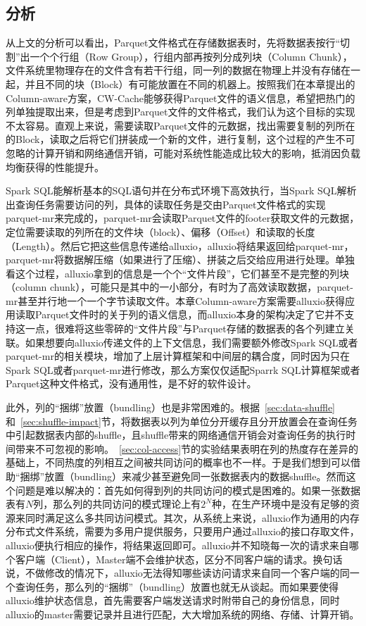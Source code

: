 \subsection{分析}
\label{subsec:simp-analysis}

\par 从上文的分析可以看出，Parquet文件格式在存储数据表时，先将数据表按行“切割”出一个个行组（Row Group），行组内部再按列分成列块（Column Chunk），文件系统里物理存在的文件含有若干行组，同一列的数据在物理上并没有存储在一起，并且不同的块（Block）有可能放置在不同的机器上。按照我们在本章提出的Column-aware方案，CW-Cache能够获得Parquet文件的语义信息，希望把热门的列单独提取出来，但是考虑到Parquet文件的文件格式，我们认为这个目标的实现不太容易。直观上来说，需要读取Parquet文件的元数据，找出需要复制的列所在的Block，读取之后将它们拼装成一个新的文件，进行复制，这个过程的产生不可忽略的计算开销和网络通信开销，可能对系统性能造成比较大的影响，抵消因负载均衡获得的性能提升。

\par Spark SQL能解析基本的SQL语句并在分布式环境下高效执行，当Spark SQL解析出查询任务需要访问的列，具体的读取任务是交由Parquet文件格式的实现parquet-mr\cite{parquet-mr}来完成的，parquet-mr会读取Parquet文件的footer获取文件的元数据，定位需要读取的列所在的文件块（block）、偏移（Offset）和读取的长度（Length）。然后它把这些信息传递给alluxio，alluxio将结果返回给parquet-mr，parquet-mr将数据解压缩（如果进行了压缩）、拼装之后交给应用进行处理。单独看这个过程，alluxio拿到的信息是一个个“文件片段”，它们甚至不是完整的列块（column chunk），可能只是其中的一小部分，有时为了高效读取数据，parquet-mr甚至并行地一个一个字节读取文件。本章Column-aware方案需要alluxio获得应用读取Parquet文件时的关于列的语义信息，而alluxio本身的架构决定了它并不支持这一点，很难将这些零碎的“文件片段”与Parquet存储的数据表的各个列建立关联。如果想要向alluxio传递文件的上下文信息，我们需要额外修改Spark SQL或者parquet-mr的相关模块，增加了上层计算框架和中间层的耦合度，同时因为只在Spark SQL或者parquet-mr进行修改，那么方案仅仅适配Sparrk SQL计算框架或者Parquet这种文件格式，没有通用性，是不好的软件设计。

\par 此外，列的“捆绑”放置（bundling）也是非常困难的。根据~\ref{sec:data-shuffle}和~\ref{sec:shuffle-impact}节，将数据表以列为单位分开缓存且分开放置会在查询任务中引起数据表内部的shuffle，且shuffle带来的网络通信开销会对查询任务的执行时间带来不可忽视的影响。~\ref{sec:col-access}节的实验结果表明在列的热度存在差异的基础上，不同热度的列相互之间被共同访问的概率也不一样。于是我们想到可以借助“捆绑”放置（bundling）来减少甚至避免同一张数据表内的数据shuffle。然而这个问题是难以解决的：首先如何得到列的共同访问的模式是困难的。如果一张数据表有$N$列，那么列的共同访问的模式理论上有$2^N$种，在生产环境中是没有足够的资源来同时满足这么多共同访问模式。其次，从系统上来说，alluxio作为通用的内存分布式文件系统，需要为多用户提供服务，只要用户通过alluxio的接口存取文件，alluxio便执行相应的操作，将结果返回即可。alluxio并不知晓每一次的请求来自哪个客户端（Client），Master端不会维护状态，区分不同客户端的请求。换句话说，不做修改的情况下，alluxio无法得知哪些读访问请求来自同一个客户端的同一个查询任务，那么列的“捆绑”（bundling）放置也就无从谈起。而如果要使得alluxio维护状态信息，首先需要客户端发送请求时附带自己的身份信息，同时alluxio的master需要记录并且进行匹配，大大增加系统的网络、存储、计算开销。

